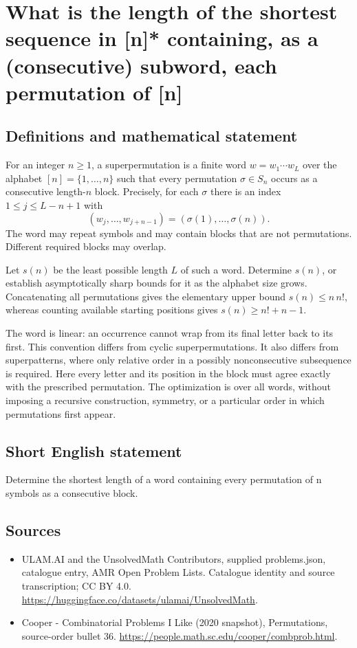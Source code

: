 \documentclass[11pt,a4paper]{article}
\begin{document}
\section*{What is the length of the shortest sequence in [n]* containing, as a (consecutive) subword, each permutation of [n]}\label{statement}

\subsection{Definitions and mathematical statement}
For an integer $n\ge1$, a superpermutation is a finite word
$w=w_1\cdots w_L$ over the alphabet $[n]=\{1,\ldots,n\}$ such
that every permutation $\sigma\in S_n$ occurs as a consecutive
length-$n$ block. Precisely, for each $\sigma$ there is an index
$1\le j\le L-n+1$ with
\[
                  (w_j,\ldots,w_{j+n-1})
                        =(\sigma(1),\ldots,\sigma(n)).
\]
The word may repeat symbols and may contain blocks that are not
permutations. Different required blocks may overlap.

Let $s(n)$ be the least possible length $L$ of such a word.
Determine $s(n)$, or establish asymptotically sharp bounds for it
as the alphabet size grows. Concatenating all permutations gives
the elementary upper bound $s(n)\le n\,n!$, whereas counting
available starting positions gives $s(n)\ge n!+n-1$.

The word is linear: an occurrence cannot wrap from its final
letter back to its first. This convention differs from cyclic
superpermutations. It also differs from superpatterns, where only
relative order in a possibly nonconsecutive subsequence is
required. Here every letter and its position in the block must
agree exactly with the prescribed permutation. The optimization
is over all words, without imposing a recursive construction,
symmetry, or a particular order in which permutations first appear.
\subsection{Short English statement}
Determine the shortest length of a word containing every permutation of n symbols as a consecutive block.
\subsection{Sources}
\begin{itemize}
\item[S1] ULAM.AI and the UnsolvedMath Contributors, supplied problems.json, catalogue entry, AMR Open Problem Lists. Catalogue identity and source transcription; CC BY 4.0.
\url{https://huggingface.co/datasets/ulamai/UnsolvedMath}.
\item[S2] Cooper - Combinatorial Problems I Like (2020 snapshot), Permutations, source-order bullet 36. 
\url{https://people.math.sc.edu/cooper/combprob.html}.
\end{itemize}
\end{document}
